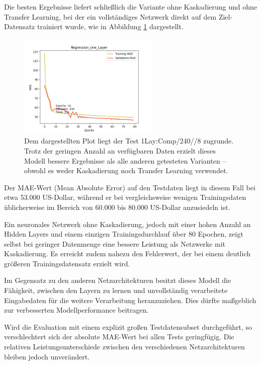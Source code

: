 Die besten Ergebnisse liefert schließlich die Variante ohne Kaskadierung und ohne Transfer Learning, bei der ein vollständiges Netzwerk direkt 
auf dem Ziel-Datensatz trainiert wurde, wie in Abbildung \ref{fig:smallonlcomp} dargestellt.

\begin{figure}
    \centering
    \includegraphics[height=5cm]{../../Plots/ba_plots/regression_small/onelayer_complete.png}
    \caption{\label{fig:smallonlcomp} 
    \small{Dem dargestellten Plot liegt der Test 1Lay:Comp/240//8 zugrunde. Trotz der geringen Anzahl an verfügbaren Daten erzielt dieses Modell 
    bessere Ergebnisse als alle anderen getesteten Varianten – obwohl es weder Kaskadierung noch Transfer Learning verwendet.}}
\end{figure}

Der MAE-Wert (Mean Absolute Error) auf den Testdaten liegt in diesem Fall bei etwa 53.000 US-Dollar, während er bei vergleichsweise wenigen 
Trainingsdaten üblicherweise im Bereich von 60.000 bis 80.000 US-Dollar anzusiedeln ist.

Ein neuronales Netzwerk ohne Kaskadierung, jedoch mit einer hohen Anzahl an Hidden Layers und einem einzigen Trainingsdurchlauf über 80 Epochen, 
zeigt selbst bei geringer Datenmenge eine bessere Leistung als Netzwerke mit Kaskadierung. Es erreicht zudem nahezu den Fehlerwert, der bei 
einem deutlich größeren Trainingsdatensatz erzielt wird.

Im Gegensatz zu den anderen Netzarchitekturen besitzt dieses Modell die Fähigkeit, zwischen den Layern zu lernen und unvollständig verarbeitete 
Eingabedaten für die weitere Verarbeitung heranzuziehen. Dies dürfte maßgeblich zur verbesserten Modellperformance beitragen.

Wird die Evaluation mit einem explizit großen Testdatensubset durchgeführt, so verschlechtert sich der absolute MAE-Wert bei allen Tests 
geringfügig. Die relativen Leistungsunterschiede zwischen den verschiedenen Netzarchitekturen bleiben jedoch unverändert.
